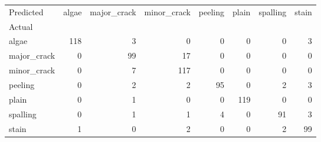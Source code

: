 \begin{tabular}{lrrrrrrr}
\toprule
Predicted & algae & major_crack & minor_crack & peeling & plain & spalling & stain \\
Actual &  &  &  &  &  &  &  \\
\midrule
algae & 118 & 3 & 0 & 0 & 0 & 0 & 3 \\
major_crack & 0 & 99 & 17 & 0 & 0 & 0 & 0 \\
minor_crack & 0 & 7 & 117 & 0 & 0 & 0 & 0 \\
peeling & 0 & 2 & 2 & 95 & 0 & 2 & 3 \\
plain & 0 & 1 & 0 & 0 & 119 & 0 & 0 \\
spalling & 0 & 1 & 1 & 4 & 0 & 91 & 3 \\
stain & 1 & 0 & 2 & 0 & 0 & 2 & 99 \\
\bottomrule
\end{tabular}
